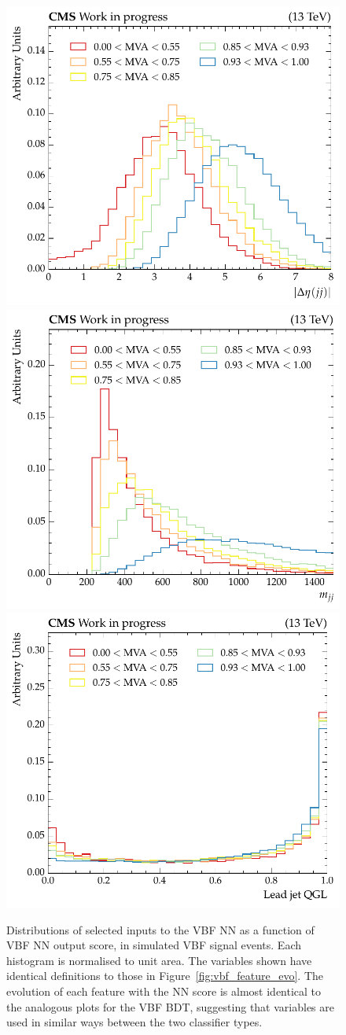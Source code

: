 \begin{figure}[htbp!] 
\centering 
\includegraphics[width =0.32\linewidth]{Figures/Hee/VBF/DeepLearning/interpretation/VBF_DNN_dijetAbsDEta.pdf}
\includegraphics[width =0.32\linewidth]{Figures/Hee/VBF/DeepLearning/interpretation/VBF_DNN_dijetMass.pdf}\hfill
\includegraphics[width =0.33\linewidth]{Figures/Hee/VBF/DeepLearning/interpretation/VBF_DNN_leadJetQGL.pdf}\hfill

\caption[The distribution of selected inputs to the VBF LSTM neural network as a function of the model output score.]{Distributions of selected inputs to the VBF NN as a function of VBF NN output score, in simulated VBF signal events. Each histogram is normalised to unit area. The variables shown have identical definitions to those in Figure~\ref{fig:vbf_feature_evo}. The evolution of each feature with the NN score is almost identical to the analogous plots for the VBF BDT, suggesting that variables are used in similar ways between the two classifier types.}
\label{fig:vbf_feature_evo_dnn}
\end{figure}

